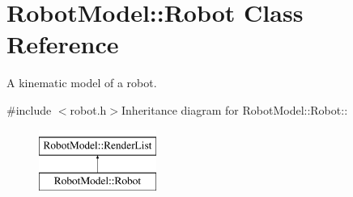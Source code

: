 \hypertarget{class_robot_model_1_1_robot}{
\section{RobotModel::Robot Class Reference}
\label{class_robot_model_1_1_robot}
}


A kinematic model of a robot.  


{\ttfamily \#include $<$robot.h$>$}Inheritance diagram for RobotModel::Robot::\begin{figure}[H]
\begin{center}
\leavevmode
\includegraphics[height=2cm]{class_robot_model_1_1_robot}
\end{center}
\end{figure}
